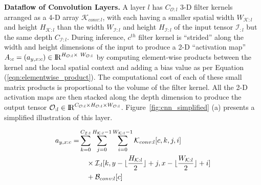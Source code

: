 \vspace{2mm}
\noindent \textbf{Dataflow of Convolution Layers.}
A layer $l$ has $C_{\mathcal{O}:l}$ 3-D filter kernels arranged as a 4-D array $\mathcal{K}_{conv:l}$, with each having a smaller spatial width $W_{\mathcal{K}:l}$ and height $H_{\mathcal{K}:l}$ than the width $W_{\mathcal{I}:l}$ and height $H_{\mathcal{I}:l}$ of the input tensor $\mathcal{I}_{:l}$ but the same depth $C_{\mathcal{I}:l}$. During inference, $c^{th}$ filter kernel is ``strided'' along the width and height dimensions of the input to produce a 2-D ``activation map'' $A_{:c}=(a_{y,x:c})\in \mathcal{\rm I\!R}^{H_{\mathcal{O}:l} \times~ W_{\mathcal{O}:l}}$ by computing element-wise products between the kernel and the local spatial context and adding a bias value as per Equation (\ref{eqn:elementwise_product}). The computational cost of each of these small matrix products is proportional to the volume of the filter kernel. All the 2-D activation maps are then stacked along the depth dimension to produce the output tensor $\mathcal{O}_{:l} \in \mathcal{\rm I\!R}^{C_{\mathcal{O}:l} \times H_{\mathcal{O}:l} \times W_{\mathcal{O}:l}}$.
Figure~\ref{fig:cnn_simplified} (a) presents a simplified illustration of this layer.

\vspace{-4mm}
\begin{align}
\label{eqn:elementwise_product}
\begin{split}
a_{y,x:c} =& \sum_{k=0}^{C_{\mathcal{I}:l} } \sum_{j=0}^{H_{\mathcal{K}:l}-1} \sum_{i=0}^{W_{\mathcal{K}:l}-1} \mathcal{K}_{conv:l}[c, k, j, i] \\
& \quad \times \mathcal{I}_{:l}[k,y-\floor{\frac{H_{\mathcal{K}:l} }{2}}+j,x-\floor{\frac{W_{\mathcal{K}:l} }{2}}+i] \\
& \quad + \mathcal{B}_{conv:l}[c]
\end{split}
\vspace{-8mm}
\end{align}



